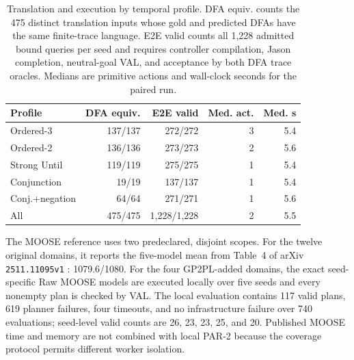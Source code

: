 \begin{table}[htbp]
\centering
\small
\setlength{\tabcolsep}{1.7pt}
\begin{tabular}{lrrrr}
\toprule
Profile & DFA equiv. & E2E valid & Med. act. & Med. s \\
\midrule
Ordered-3 & 137/137 & 272/272 & 3 & 5.4 \\
Ordered-2 & 136/136 & 273/273 & 2 & 5.6 \\
Strong Until & 119/119 & 275/275 & 1 & 5.4 \\
Conjunction & 19/19 & 137/137 & 1 & 5.4 \\
Conj.+negation & 64/64 & 271/271 & 1 & 5.6 \\
\midrule
All & 475/475 & 1,228/1,228 & 2 & 5.5 \\
\bottomrule
\end{tabular}
\caption{Translation and execution by temporal profile. DFA equiv. counts the
475 distinct translation inputs whose gold and predicted DFAs have the same
finite-trace language. E2E valid counts all 1,228 admitted bound queries per
seed and requires controller compilation, Jason completion, neutral-goal VAL,
and acceptance by both DFA trace oracles. Medians are primitive actions and
wall-clock seconds for the paired run.}
\label{tab:profile-results}
\end{table}

The MOOSE reference uses two predeclared, disjoint scopes. For the twelve
original domains, it reports the five-model mean from Table~4 of arXiv
\texttt{2511.11095v1} \cite{Chen2025MooseExtended}: 1079.6/1080. For the four
GP2PL-added domains, the exact seed-specific Raw MOOSE models are executed
locally over five seeds and every nonempty plan is checked by VAL. The local
evaluation contains 117
valid plans, 619 planner failures, four timeouts, and no infrastructure failure
over 740 evaluations; seed-level valid counts are 26, 23, 23, 25, and 20.
Published MOOSE time and memory are not combined with local PAR-2 because the
coverage protocol permits different worker isolation.

